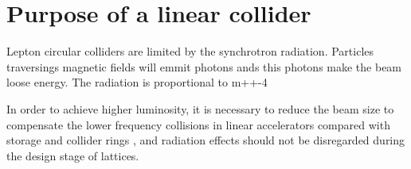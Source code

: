 \chapter{Purpose of a linear collider}
Lepton circular colliders are limited by the synchrotron radiation. Particles traversings magnetic fields will emmit photons ands this photons make the beam loose energy. The radiation is proportional to m++-4 

In order to achieve higher luminosity, it is necessary to reduce the beam size to compensate the lower frequency collisions in linear accelerators compared with storage and collider rings \cite{Delahaye1999369}, and radiation effects should not be disregarded during the design stage of lattices. 